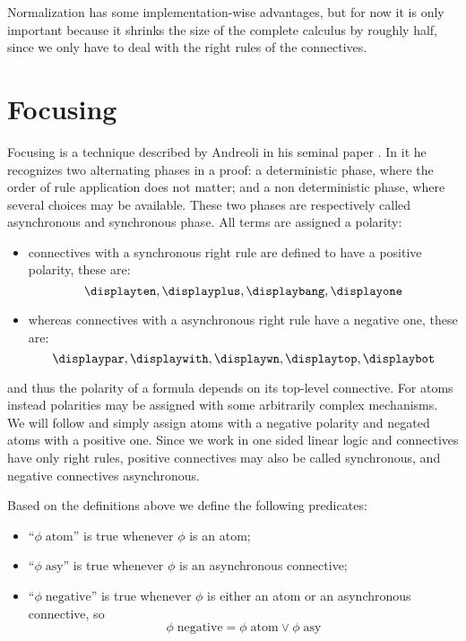 Normalization has some implementation-wise advantages, but for now it is only important because it shrinks the size of the complete calculus by roughly half, since we only have to deal with the right rules of the connectives.

\section{Focusing}
Focusing is a technique described by Andreoli in his seminal paper \cite{Focusing}.
In it he recognizes two alternating phases in a proof: a deterministic phase, where the order of rule application does not matter; and a non deterministic phase, where several choices may be available.
These two phases are respectively called asynchronous and synchronous phase.
All terms are assigned a polarity: 
\begin{itemize}
	\item connectives with a synchronous right rule are defined to have a positive polarity, these are:
		$$ \displayten, \displayplus, \displaybang, \displayone$$
	\item whereas connectives with a asynchronous right rule have a negative one, these are:
		$$ \displaypar, \displaywith, \displaywn, \displaytop, \displaybot$$
\end{itemize}
and thus the polarity of a formula depends on its top-level connective.
For atoms instead polarities may be assigned with some arbitrarily complex mechanisms.
We will follow \cite{LiangMiller} and simply assign atoms with a negative polarity and negated atoms with a positive one.
Since we work in one sided linear logic and connectives have only right rules, positive connectives may also be called synchronous, and negative connectives asynchronous.
\begin{define}
	Based on the definitions above we define the following predicates:
	\begin{itemize}
		\item ``$\phi \; \mathrm{atom}$'' is true whenever $\phi$ is an atom;
		\item ``$\phi \; \mathrm{asy}$'' is true whenever $\phi$ is an asynchronous connective;
		\item ``$\phi \; \mathrm{negative}$'' is true whenever $\phi$ is either an atom or an asynchronous connective, so
			$$ \phi \; \mathrm{negative} = \phi \; \mathrm{atom} \vee \phi \; \mathrm{asy} $$
	\end{itemize}
\end{define}

